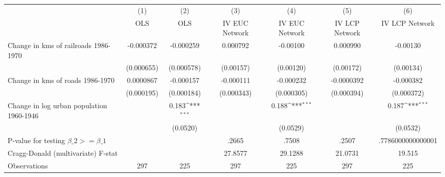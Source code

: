 {
\def\sym#1{\ifmmode^{#1}\else\(^{#1}\)\fi}
\begin{tabular}{l*{6}{c}}
\hline\hline
                &\multicolumn{1}{c}{(1)}&\multicolumn{1}{c}{(2)}&\multicolumn{1}{c}{(3)}&\multicolumn{1}{c}{(4)}&\multicolumn{1}{c}{(5)}&\multicolumn{1}{c}{(6)}\\
                &\multicolumn{1}{c}{OLS}&\multicolumn{1}{c}{OLS}&\multicolumn{1}{c}{IV EUC Network}&\multicolumn{1}{c}{IV EUC Network}&\multicolumn{1}{c}{IV LCP Network}&\multicolumn{1}{c}{IV LCP Network}\\
\hline
Change in kms of railroads 1986-1970&-0.000372         &-0.000259         & 0.000792         & -0.00100         & 0.000990         & -0.00130         \\
                &(0.000655)         &(0.000578)         &(0.00157)         &(0.00120)         &(0.00172)         &(0.00134)         \\
[1em]
Change in kms of roads 1986-1970&0.0000867         &-0.000157         &-0.000111         &-0.000232         &-0.0000392         &-0.000382         \\
                &(0.000195)         &(0.000184)         &(0.000343)         &(0.000305)         &(0.000394)         &(0.000372)         \\
[1em]
Change in log urban population 1960-1946&                  &    0.183\sym{***}&                  &    0.188\sym{***}&                  &    0.187\sym{***}\\
                &                  & (0.0520)         &                  & (0.0529)         &                  & (0.0532)         \\
\hline
P-value for testing $\beta\_{2} >= \beta\_{1}$&                  &                  &    .2665         &    .7508         &    .2507         &.7786000000000001         \\
Cragg-Donald (multivariate) F-stat&                  &                  &  27.8577         &  29.1288         &  21.0731         &   19.515         \\
Observations    &      297         &      225         &      297         &      225         &      297         &      225         \\
\hline\hline
\end{tabular}
}
